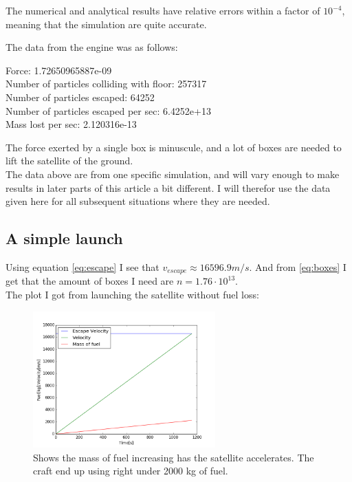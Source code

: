 \documentclass[a4paper, 10pt]{article}
\begin{document}
The numerical and analytical results have relative errors within a factor of $10^{-4}$, meaning that the simulation are quite accurate.

The data from the engine was as follows:

\begin{tcolorbox}
Force:  1.72650965887e-09 \\
Number of particles colliding with floor:  257317 \\
Number of particles escaped:  64252 \\
Number of particles escaped per sec:  6.4252e+13 \\
Mass lost per sec:  2.120316e-13
\end{tcolorbox}

The force exerted by a single box is minuscule, and a lot of boxes are needed to lift the satellite of the ground. \\

The data above are from one specific simulation, and will vary enough to make results in later parts of this article a bit different. I will therefor use the data given here for all subsequent situations where they are needed.

\subsection{A simple launch}

Using equation \ref{eq:escape} I see that $v_{escape} \approx 16596.9 m/s$. And from \ref{eq:boxes} I get that the amount of boxes I need are $n = 1.76 \cdot 10^{13}$. \\

The plot I got from launching the satellite without fuel loss:


\begin{figure}[H]
\begin{center}
\includegraphics[width = 70mm]{part1launchConstMass.png}
\caption{Shows the mass of fuel increasing has the satellite accelerates. The craft end up using right under 2000 kg of fuel.}
\end{center}
\end{figure}
\end{document}
